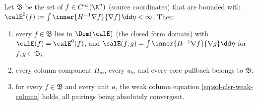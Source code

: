 \documentclass[../main.tex]{subfiles}
\begin{document}
\begin{lemma}
\label{lem:sol-clsr-form-membership}
Let $\mathfrak B$ be the set of $f\in C^\infty(\R^n)$ (source coordinates) that are bounded
with $\calE^0(f):=\int\inner{H^{-1}\nabla f}{\nabla f}\dd\eta<\infty$.  Then:
\begin{enumerate}[label=(\roman*),leftmargin=2.2em]
\item every $f\in\mathfrak B$ lies in $\Dom(\calE)$ (the closed form domain) with
$\calE(f)=\calE^0(f)$, and $\calE(f,g)=\int\inner{H^{-1}\nabla f}{\nabla g}\dd\eta$ for
$f,g\in\mathfrak B$;
\item every column component $H_{ai}$, every $u_b$, and every core pullback belongs to
$\mathfrak B$;
\item for every $f\in\mathfrak B$ and every unit $a$, the weak column equation
\eqref{eq:sol-clsr-weak-column} holds, all pairings being absolutely convergent.
\end{enumerate}
\end{lemma}
\end{document}
